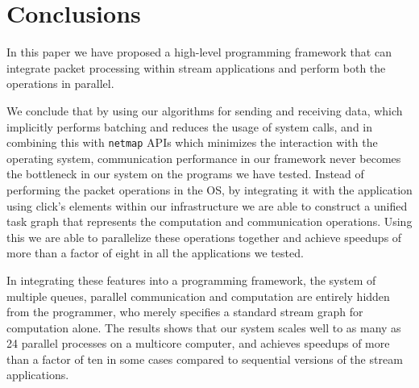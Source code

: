 \documentclass[conference]{IEEEtran}
\begin{document}
\section{Conclusions}
In this paper we have proposed a high-level programming framework that can integrate packet processing within stream applications and perform both the operations in parallel. 

We conclude that by using our algorithms for sending and receiving data, which implicitly performs batching and reduces the usage of system calls, and in combining this with \texttt{netmap} APIs which minimizes the interaction with the operating system, communication performance in our framework never becomes the bottleneck in our system on the programs we have tested. Instead of performing the packet operations in the OS, by integrating it with the application using click's elements within our infrastructure we are able to construct a unified task graph that represents the computation and communication operations. Using this we are able to parallelize these operations together and achieve speedups of more than a factor of eight in all the applications we tested. 

In integrating these features into a programming framework, the system of multiple queues, parallel communication and computation are entirely hidden from the programmer, who merely specifies a standard stream graph for computation alone. The results shows that our system scales well to as many as 24 parallel processes on a multicore computer, and achieves speedups of more than a factor of ten in some cases compared to sequential versions of the stream applications.

%
%
\end{document}
